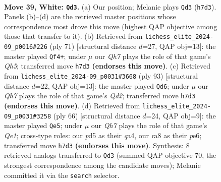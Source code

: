 \documentclass[11pt]{article}
\begin{document}
\clearpage

\begin{figure}[p]\centering
\begin{subfigure}{0.46\textwidth}\centering
\resizebox{\linewidth}{!}{%
\newchessgame
\chessboard[
  setfen={r7/7Q/4kp2/3p4/p7/6P1/P4PKP/4q3 w - - 0 39},
  showmover=false,
  pgfstyle=straightmove, color=movearrow, markmove={h7-d3}
]}
\caption{}
\end{subfigure}\hfill
\begin{subfigure}{0.46\textwidth}\centering
\resizebox{\linewidth}{!}{%
\newchessgame
\chessboard[
  setfen={8/8/Q1p3pk/7p/7q/1P6/P5P1/5K2 b - - 0 36},
  showmover=false,
  pgfstyle=straightmove, color=movearrow, markmove={h4-f4}
]}
\caption{}
\end{subfigure}
\\[4pt]
\begin{subfigure}{0.46\textwidth}\centering
\resizebox{\linewidth}{!}{%
\newchessgame
\chessboard[
  setfen={8/3q1pkp/6p1/8/4Q2P/6P1/5PK1/8 b - - 2 47},
  showmover=false,
  pgfstyle=straightmove, color=movearrow, markmove={d7-d6}
]}
\caption{}
\end{subfigure}\hfill
\begin{subfigure}{0.46\textwidth}\centering
\resizebox{\linewidth}{!}{%
\newchessgame
\chessboard[
  setfen={3R4/5kpp/p3pr2/8/q7/6P1/5PKP/4Q3 w - - 2 34},
  showmover=false,
  pgfstyle=straightmove, color=movearrow, markmove={e1-e5}
]}
\caption{}
\end{subfigure}
\caption{\textbf{Move 39, White: \texttt{Qd3}.} (a) Our position; Melanie plays \texttt{Qd3} (\texttt{h7d3}). Panels (b)--(d) are the retrieved master positions whose correspondence most drove this move (highest QAP objective among those that transfer to it). (b) Retrieved from \texttt{lichess\_elite\_2024-09\_p0016\#226} (ply 71) [structural distance $d$=27, QAP obj=13]: the master played \texttt{Qf4+}; under $\mu$ our \emph{Qh7} plays the role of that game's \emph{Qh5}; transferred move \texttt{h7d3} \textbf{(endorses this move)}. (c) Retrieved from \texttt{lichess\_elite\_2024-09\_p0031\#3668} (ply 93) [structural distance $d$=22, QAP obj=13]: the master played \texttt{Qd6}; under $\mu$ our \emph{Qh7} plays the role of that game's \emph{Qd2}; transferred move \texttt{h7d3} \textbf{(endorses this move)}. (d) Retrieved from \texttt{lichess\_elite\_2024-09\_p0031\#3258} (ply 66) [structural distance $d$=24, QAP obj=9]: the master played \texttt{Qe5}; under $\mu$ our \emph{Qh7} plays the role of that game's \emph{Qe1}; cross-type roles: our \emph{p}d5 as their \emph{q}a4, our \emph{r}a8 as their \emph{p}e6; transferred move \texttt{h7d3} \textbf{(endorses this move)}. Synthesis: 8 retrieved analogs transferred to \texttt{Qd3} (summed QAP objective 70, the strongest correspondence among the candidate moves); Melanie committed it via the \texttt{search} selector.}
\label{fig:thought-m76}
\end{figure}
\end{document}
